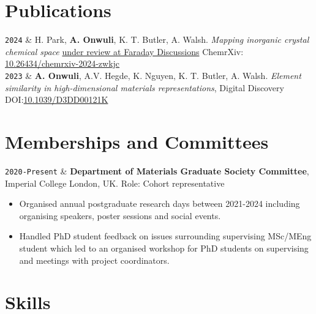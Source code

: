 \documentclass[11pt,a4paper]{article}
\newcommand{\ICL}{Imperial College London}
\newcommand{\LastName}{Onwuli}
\newcommand{\Initials}{A}
\newcommand{\Me}{\textbf{\Initials. \LastName}}  %
\newcommand{\Aron}{A. Walsh}
\newcommand{\Keith}{K. T. Butler}
\newcommand{\Ashish}{A.V. Hegde}
\newcommand{\Kevin}{K. Nguyen}
\newcommand{\Hyunsoo}{H. Park}
\newcommand{\Duration}[2]{\fontsize{10pt}{0}\selectfont \texttt{#1-#2}}
\newcommand{\Year}[1]{\fontsize{10pt}{0}\selectfont \texttt{#1}}
\newcommand{\Ongoing}{Present}
\newcommand{\DOI}[1]{DOI:\href{https://doi.org/#1}{#1}}
\newcommand{\ChemPreprint}[1]{\faFilePdf{} ChemrXiv: \href{https://doi.org/#1}{#1}}
\begin{document}
\section{Publications}

\begin{EntriesTableYear}
  \Year{2024} &
  \Hyunsoo, \Me, \Keith, \Aron.
  \textit{Mapping inorganic crystal chemical space}
  \newline
  \underline{under review at Faraday Discussions} \ChemPreprint{10.26434/chemrxiv-2024-zwkjc}
  \\
  \Year{2023}  &
  \Me, \Ashish, \Kevin, \Keith, \Aron.
  \textit{Element similarity in high-dimensional materials representations},
  \newline
  Digital Discovery
  \DOI{10.1039/D3DD00121K}
  \\
\end{EntriesTableYear}
\section{Memberships and Committees}

\begin{EntriesTableDuration}
  \Duration{2020}{\Ongoing} &
  \textbf{Department of Materials Graduate Society Committee}, \ICL{}, UK.
  \newline
  Role: Cohort representative
  \begin{itemize}
    \item Organised annual postgraduate research days between 2021-2024  including organising speakers, poster sessions and social events.
    \item Handled PhD student feedback on issues surrounding supervising MSc/MEng student which led to an organised workshop for PhD students on supervising and meetings with project coordinators.
    \vspace{-\baselineskip}
  \end{itemize}
  \vspace{-\baselineskip}
\end{EntriesTableDuration}
\section{Skills}
\end{document}
